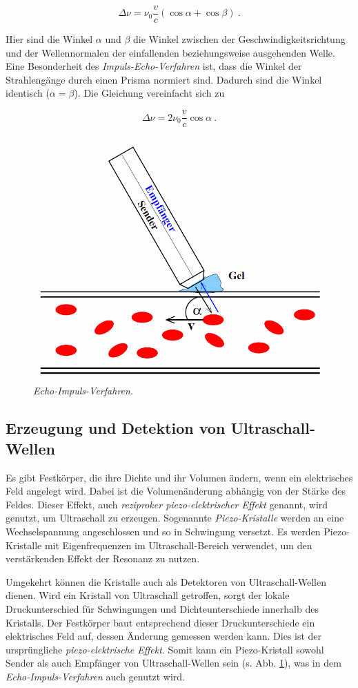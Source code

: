 \begin{equation*}
    \Delta \nu = \nu_0 \frac{v}{c}(\cos{\alpha} + \cos{\beta}) \:.
\end{equation*}

Hier sind die Winkel $\alpha$ und $\beta$ die Winkel zwischen der Geschwindigkeitsrichtung und der Wellennormalen der einfallenden beziehungsweise ausgehenden Welle.
Eine Besonderheit des \textit{Impuls-Echo-Verfahren} ist, dass die Winkel der Strahlengänge durch einen Prisma normiert sind. Dadurch sind die Winkel identisch ($\alpha = \beta$).
Die Gleichung vereinfacht sich zu 

\begin{equation}
    \Delta \nu = 2 \nu_0 \frac{v}{c} \cos{\alpha} \:.
    \label{eqn:doppler}
\end{equation}

\begin{figure}
    \centering
    \includegraphics[width=.5\textwidth]{media/echo-impuls-verfahren.png}
    \caption{\textit{Echo-Impuls-Verfahren}. \cite{Versuchsanleitung}}
    \label{fig:eiv}
\end{figure}

\subsection{Erzeugung und Detektion von Ultraschall-Wellen}
Es gibt Festkörper, die ihre Dichte und ihr Volumen ändern, wenn ein elektrisches Feld angelegt wird. Dabei ist die Volumenänderung abhängig von der Stärke des Feldes.
Dieser Effekt, auch \textit{reziproker piezo-elektrischer Effekt} genannt, wird genutzt, um Ultraschall zu erzeugen. Sogenannte \textit{Piezo-Kristalle} werden an eine Wechselspannung angeschlossen und
so in Schwingung versetzt. Es werden Piezo-Kristalle mit Eigenfrequenzen im Ultraschall-Bereich verwendet, um den verstärkenden Effekt der Resonanz zu nutzen.

Umgekehrt können die Kristalle auch als Detektoren von Ultraschall-Wellen dienen. Wird ein Kristall von Ultraschall getroffen, sorgt der lokale Druckunterschied für Schwingungen
und Dichteunterschiede innerhalb des Kristalls. Der Festkörper baut entsprechend dieser Druckunterschiede ein elektrisches Feld auf, dessen Änderung gemessen werden kann. Dies ist der ursprüngliche \textit{piezo-elektrische Effekt}.
Somit kann ein Piezo-Kristall sowohl Sender als auch Empfänger von Ultraschall-Wellen sein (s. Abb. \ref{fig:eiv}), was in dem \textit{Echo-Impuls-Verfahren} auch genutzt wird.

